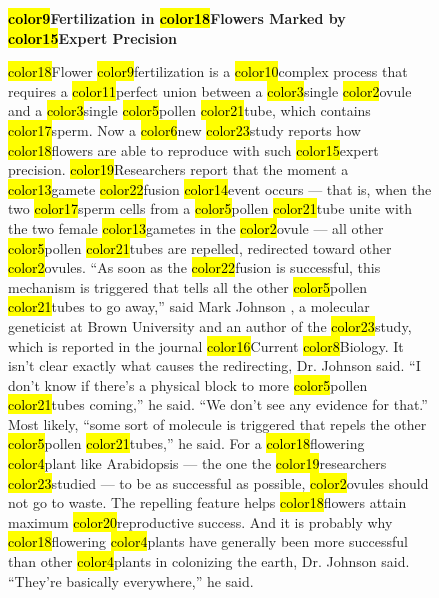 \begin{figure}
    \centering
    \begin{mdframed}[backgroundcolor=blue!2, font=\small]
    
    \textbf{\hl{color9}{Fertilization} in \hl{color18}{Flowers} Marked by \hl{color15}{Expert Precision}}

    \vspace{0.9em}

    \hl{color18}{Flower} \hl{color9}{fertilization} is a \hl{color10}{complex process} that requires a \hl{color11}{perfect union} between a \hl{color3}{single} \hl{color2}{ovule} {and} a \hl{color3}{single} \hl{color5}{pollen} \hl{color21}{tube}, which contains \hl{color17}{sperm}. Now a \hl{color6}{new} \hl{color23}{study} reports how \hl{color18}{flowers} are able to reproduce with such \hl{color15}{expert precision}. \hl{color19}{Researchers} report that the moment a \hl{color13}{gamete} \hl{color22}{fusion} \hl{color14}{event} occurs — that is, when the two \hl{color17}{sperm} cells from a \hl{color5}{pollen} \hl{color21}{tube} unite with the two female \hl{color13}{gametes} in the \hl{color2}{ovule} — all other \hl{color5}{pollen} \hl{color21}{tubes} are repelled, redirected toward other \hl{color2}{ovules}. “As soon as the \hl{color22}{fusion} is successful, this mechanism is triggered that tells all the other \hl{color5}{pollen} \hl{color21}{tubes} to go away,” said Mark Johnson , a molecular geneticist at Brown University {and} an author of the \hl{color23}{study}, which is reported in the journal \hl{color16}{Current} \hl{color8}{Biology}. It isn’t clear exactly what causes the redirecting, Dr. Johnson said. “I don’t know if there’s a physical block to more \hl{color5}{pollen} \hl{color21}{tubes} coming,” he said. “We don’t see any evidence for that.” Most likely, “some sort of molecule is triggered that repels the other \hl{color5}{pollen} \hl{color21}{tubes},” he said. For a \hl{color18}{flowering} \hl{color4}{plant} like Arabidopsis — the one the \hl{color19}{researchers} \hl{color23}{studied} — to be as successful as possible, \hl{color2}{ovules} should not go to waste. The repelling feature helps \hl{color18}{flowers} attain maximum \hl{color20}{reproductive} success. {And} it is probably why \hl{color18}{flowering} \hl{color4}{plants} have generally been more successful than other \hl{color4}{plants} in colonizing the earth, Dr. Johnson said. “They’re basically everywhere,” he said.

    \vspace{1.1em}


\end{mdframed}
\end{figure}
